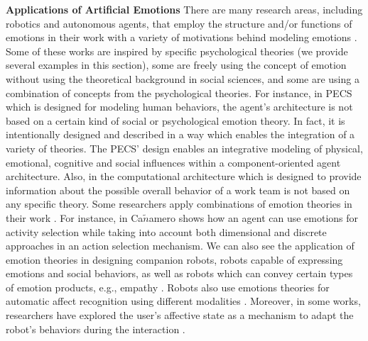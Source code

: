 \textbf{Applications of Artificial Emotions} There are many research areas,
including robotics and autonomous agents, that employ the structure and/or
functions of emotions in their work with a variety of motivations behind
modeling emotions \cite{wehrle:motivations-modeling-emotion}. Some of these
works are inspired by specific psychological theories (we provide several
examples in this section), some are freely using the concept of emotion without
using the theoretical background in social sciences, and some are using a
combination of concepts from the psychological theories. For instance, in PECS
\cite{urban:pecs} which is designed for modeling human behaviors, the agent's
architecture is not based on a certain kind of social or psychological emotion
theory. In fact, it is intentionally designed and described in a way which
enables the integration of a variety of theories. The PECS' design enables an
integrative modeling of physical, emotional, cognitive and social influences
within a component-oriented agent architecture. Also, in
\cite{miranda:teamwork-multiagent-system} the computational architecture which
is designed to provide information about the possible overall behavior of a work
team is not based on any specific theory. Some researchers apply combinations of
emotion theories in their work \cite{kiryazov:modeling-appraisal-pad}. For
instance, in \cite{canamero:designing-activity-selection} Ca$\tilde{n}$amero
shows how an agent can use emotions for activity selection while taking into
account both dimensional and discrete approaches in an action selection
mechanism. We can also see the application of emotion theories in designing
companion robots, robots capable of expressing emotions and social behaviors, as
well as robots which can convey certain types of emotion products, e.g., empathy
\cite{breazeal:expressive-behavior} \cite{leite:empathy-hri}
\cite{paiva:emotion-modeling} \cite{shayganfar:methodology}. Robots also use
emotions theories for automatic affect recognition using different modalities
\cite{hegel:empathic-robot} \cite{zeng:affect-recognition}. Moreover, in some
works, researchers have explored the user's affective state as a mechanism to
adapt the robot's behaviors during the interaction
\cite{breazeal:sociable-robot} \cite{liu:affect-robot-behavior}.\\


